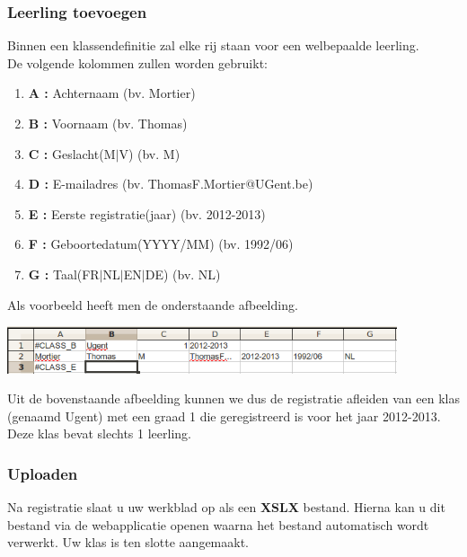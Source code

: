 \begin{section}
\begin{subsection}
\subsubsection*{Leerling toevoegen}
Binnen een klassendefinitie zal elke rij staan voor een welbepaalde leerling.\\
De volgende kolommen zullen worden gebruikt:
\begin{enumerate}
\item \textbf{A : } Achternaam (bv. Mortier)
\item \textbf{B : } Voornaam (bv. Thomas)
\item \textbf{C : } Geslacht(M$\vert$V) (bv. M)
\item \textbf{D : } E-mailadres (bv. ThomasF.Mortier@UGent.be)
\item \textbf{E : } Eerste registratie(jaar) (bv. 2012-2013)
\item \textbf{F : } Geboortedatum(YYYY/MM) (bv. 1992/06)
\item \textbf{G : } Taal(FR$\vert$NL$\vert$EN$\vert$DE) (bv. NL)
\end{enumerate}
Als voorbeeld heeft men de onderstaande afbeelding.
\begin{center}
\includegraphics[height=1.39cm]{img/leerling.png}
\end{center}
Uit de bovenstaande afbeelding kunnen we dus de registratie afleiden van een klas (genaamd Ugent) met een graad 1 die geregistreerd is voor het jaar 2012-2013. Deze klas bevat slechts 1 leerling.
\subsubsection*{Uploaden}
Na registratie slaat u uw werkblad op als een \textbf{XSLX} bestand. Hierna kan u dit bestand via de webapplicatie openen waarna het bestand automatisch wordt verwerkt. Uw klas is ten slotte aangemaakt.
\end{subsection}
\end{section}
